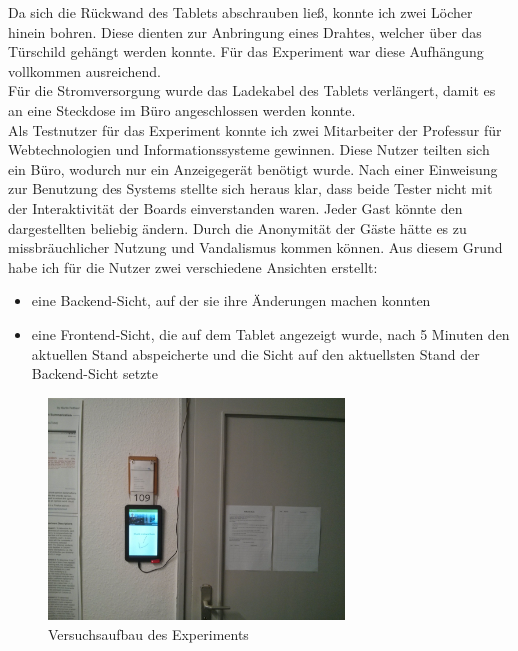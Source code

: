 Da sich die Rückwand des Tablets abschrauben ließ, konnte ich zwei Löcher hinein bohren. Diese dienten zur Anbringung eines Drahtes, welcher über das Türschild gehängt werden konnte. Für das Experiment war diese Aufhängung vollkommen ausreichend.
\\
Für die Stromversorgung wurde das Ladekabel des Tablets verlängert, damit es an eine Steckdose im Büro angeschlossen werden konnte.
\\
Als Testnutzer für das Experiment konnte ich zwei Mitarbeiter der Professur für Webtechnologien und Informationssysteme gewinnen.
Diese Nutzer teilten sich ein Büro, wodurch nur ein Anzeigegerät benötigt wurde.
Nach einer Einweisung zur Benutzung des Systems stellte sich heraus klar, dass beide Tester nicht mit der Interaktivität der Boards einverstanden waren.
Jeder Gast könnte den dargestellten beliebig ändern.
Durch die Anonymität der Gäste hätte es zu missbräuchlicher Nutzung und Vandalismus kommen können.
Aus diesem Grund habe ich für die Nutzer zwei verschiedene Ansichten erstellt:
\begin{itemize}
  \item eine Backend-Sicht, auf der sie ihre Änderungen machen konnten
  \item eine Frontend-Sicht, die auf dem Tablet angezeigt wurde, nach 5 Minuten den aktuellen Stand abspeicherte und die Sicht auf den aktuellsten Stand der Backend-Sicht setzte
\end{itemize}
\begin{figure}[h!]
  \centering
    \includegraphics[width=0.7\textwidth]{./img/experiment01.jpg}
  \caption{Versuchsaufbau des Experiments}
  \label{img:experiment01}
\end{figure}



